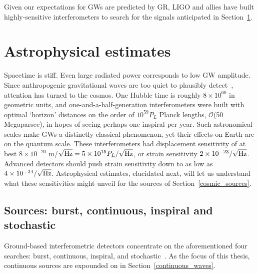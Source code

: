 Given our expectations for GWs are predicted by GR, LIGO and allies have built highly-sensitive interferometers to search for the signals anticipated in Section~\ref{estimates}.

    \section{Astrophysical estimates}
    \label{estimates}

Spacetime is stiff.
Even large radiated power corresponds to low GW amplitude.
Since anthropogenic gravitational waves are too quiet to plausibly detect~\cite{Saulson}, attention has turned to the cosmos.
One Hubble time is roughly $8\times 10^{60}$ in geometric units, and one-and-a-half-generation interferometers were built with optimal `horizon' distances on the order of $10^{59} P_L$ Planck lengths, $\mathcal{O}$(50 Megaparsec), in hopes of seeing perhaps one inspiral per year.
Such astronomical scales make GWs a distinctly classical phenomenon, yet their effects on Earth are on the quantum scale.
These interferometers had displacement sensitivity of at best $8\times 10^{-20}$ m/$\sqrt{\textup{Hz}} = 5\times10^{15} P_L/\sqrt{\textup{Hz}}$, or strain sensitivity $2\times10^{-23}/\sqrt{\textup{Hz}}$.
Advanced detectors should push strain sensitivity down to as low as $4\times10^{-24}/\sqrt{\textup{Hz}}$.
Astrophysical estimates, elucidated next, will let us understand what these sensitivities might unveil for the sources of Section~\ref{cosmic_sources}.


        \subsection{Sources: burst, continuous, inspiral and stochastic}
        \label{source_types}


Ground-based interferometric detectors concentrate on the aforementioned four searches: burst, continuous, inspiral, and stochastic~\cite{Riles2013}.
As the focus of this thesis, continuous sources are expounded on in Section~\ref{continuous_waves}.

